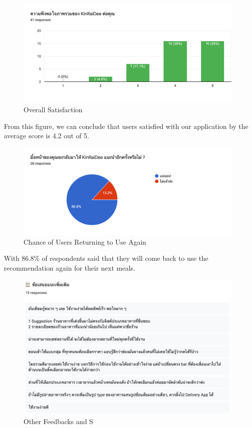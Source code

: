 \documentclass[12pt,oneside,openright,a4paper]{cpe-english-project}
\begin{document}
\begin{figure}[H]\centering
\includegraphics[width=350pt]{./images/A2OverallSatisfaction.png}
\caption{Overall Satisfaction}\label{fig:A2OverallSatisfaction}
\end{figure}\vspace{-24pt}

From this figure, we can conclude that users satisfied with our application by the average score is 4.2 out of 5.

\begin{figure}[H]\centering
\includegraphics[width=350pt]{./images/A2ChanceofUsersReturningtoUseAgain.png}
\caption{Chance of Users Returning to Use Again}\label{fig:A2ChanceofUsersReturningtoUseAgain}
\end{figure}\vspace{-24pt}

With 86.8\% of respondents said that they will come back to use the recommendation again for their next meals.

\begin{figure}[H]\centering
\includegraphics[width=350pt]{./images/A2OtherFeedbacksandSuggestions.png}
\caption{Other Feedbacks and S}\label{fig:A2OtherFeedbacksandSuggestions}
\end{figure}\vspace{-24pt}
\end{document}
